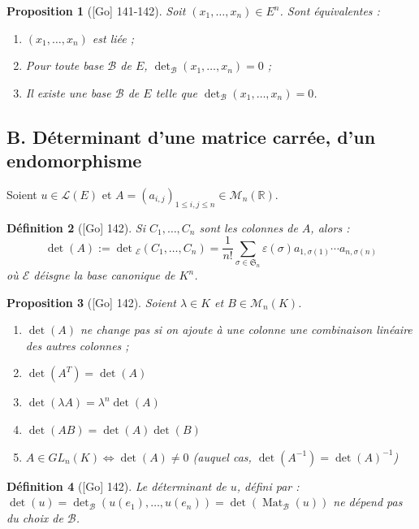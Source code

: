 \documentclass[10pt, a4paper, parskip=full, twoside, twocolumn]{report}
\newtheorem{definition}{Définition}
\newtheorem{proposition}[definition]{Proposition}
\newcommand{\IR}{\mathbb{R}}
\DeclareMathOperator{\Mat}{Mat}
\begin{document}
\begin{proposition}[\textnormal{[Go] 141-142}]
	Soit $(x_1,\dots, x_n)\in E^n$. Sont équivalentes :
	\begin{enumerate}
		\item $(x_1,\dots, x_n)$ est liée ;
		\item Pour toute base $\mathcal{B}$ de $E$, $\det_{\mathcal{B}}(x_1,\dots,x_n) = 0$ ;
		\item Il existe une base $\mathcal{B}$ de $E$ telle que $\det_{\mathcal{B}}(x_1,\dots, x_n) = 0$.
	\end{enumerate}
\end{proposition}

\subsection*{B. Déterminant d'une matrice carrée, d'un endomorphisme}
\textcolor{paragraphtext}{Soient $u\in\mathcal{L}(E)$ et $A = \left(a_{i,j}\right)_{1\leq i,j\leq n} \in \mathcal{M}_n(\IR)$.}

\begin{definition}[\textnormal{[Go] 142}]
	Si $C_1,\dots, C_n$ sont les colonnes de $A$, alors :
	$$\det(A) := \det{}_{\mathcal{E}}(C_1,\dots,C_n) = \frac{1}{n!}\sum_{\sigma\in\mathfrak{S}_n} \varepsilon(\sigma)a_{1,\sigma(1)}\cdots a_{n,\sigma(n)}$$
	où $\mathcal{E}$ déisgne la base canonique de $K^n$.
\end{definition}

\begin{proposition}[\textnormal{[Go] 142}]
	Soient $\lambda\in K$ et $B\in\mathcal{M}_n(K)$.
	\begin{enumerate}
		\item $\det(A)$ ne change pas si on ajoute à une colonne une combinaison linéaire des autres colonnes ;
		\item $\det(A^T)=\det(A)$
		\item $\det(\lambda A) = \lambda^n \det(A)$
		\item $\det(AB) = \det(A)\det(B)$
		\item $A\in GL_n(K)\iff \det(A)\neq 0$ (auquel cas, $\det(A^{-1}) = {\det(A)}^{-1}$)
	\end{enumerate}
\end{proposition}

\begin{definition}[\textnormal{[Go] 142}]
	Le déterminant de $u$, défini par :
	$\det(u) = \det_{\mathcal{B}}(u(e_1),\dots, u(e_n)) = \det(\Mat_{\mathcal{B}}(u))$
	ne dépend pas du choix de $\mathcal{B}$.
\end{definition}
\end{document}
